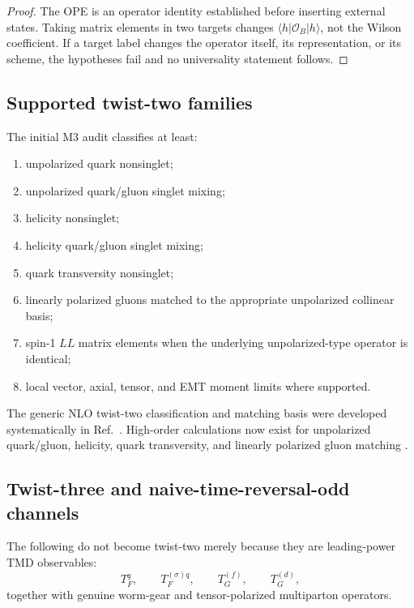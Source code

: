 \documentclass[11pt]{article}
\newcommand{\cO}{\mathcal O}
\begin{document}
\begin{proof}
The OPE is an operator identity established before inserting external states.  Taking matrix elements in two targets changes \(\langle h|\cO_B|h\rangle\), not the Wilson coefficient.  If a target label changes the operator itself, its representation, or its scheme, the hypotheses fail and no universality statement follows.
\end{proof}

\subsection{Supported twist-two families}

The initial M3 audit classifies at least:
\begin{enumerate}
\item unpolarized quark nonsinglet;
\item unpolarized quark/gluon singlet mixing;
\item helicity nonsinglet;
\item helicity quark/gluon singlet mixing;
\item quark transversity nonsinglet;
\item linearly polarized gluons matched to the appropriate unpolarized collinear basis;
\item spin-1 \(LL\) matrix elements when the underlying unpolarized-type operator is identical;
\item local vector, axial, tensor, and EMT moment limits where supported.
\end{enumerate}
The generic NLO twist-two classification and matching basis were developed systematically in Ref.~\cite{GutierrezReyesScimemiVladimirov2017}.  High-order calculations now exist for unpolarized quark/gluon, helicity, quark transversity, and linearly polarized gluon matching \cite{EbertMistlbergerVita2020,ZhuHelicity2025,ZhuTransversity2025,ZhuLinearGluon2025}.

\subsection{Twist-three and naive-time-reversal-odd channels}

The following do not become twist-two merely because they are leading-power TMD observables:
\begin{equation}
 T_F^q,
 \qquad
 T_F^{(\sigma)q},
 \qquad
 T_G^{(f)},
 \qquad
 T_G^{(d)},
 \label{eq:twist3-bases}
\end{equation}
together with genuine worm-gear and tensor-polarized multiparton operators.
\end{document}
